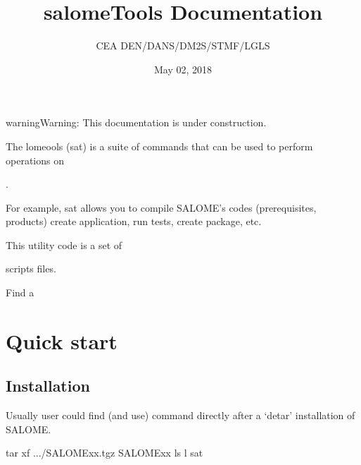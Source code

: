 \documentclass[a4paper,10pt,english]{sphinxmanual}
\title{salomeTools Documentation}
\date{May 02, 2018}
\author{CEA DEN/DANS/DM2S/STMF/LGLS}
\begin{document}
\maketitle
\sphinxtableofcontents
{}\label{\detokenize{index::doc}}
\clearpage




\begin{sphinxadmonition}{warning}{Warning:}
This documentation is under construction.
\end{sphinxadmonition}

The lomeools (sat) is a suite of commands
that can be used to perform operations on %
\begin{footnote}[1]\sphinxAtStartFootnote
{}
%
\end{footnote}.

For example, sat allows you to compile SALOME’s codes
(prerequisites, products)
create application, run tests, create package, etc.

This utility code is a set of %
\begin{footnote}[2]\sphinxAtStartFootnote
{}
%
\end{footnote} scripts files.

Find a 


\chapter{Quick start}
\label{\detokenize{index:quick-start}}\label{\detokenize{index:salome-tools}}

\section{Installation}
\label{\detokenize{installation_of_sat:installation}}\label{\detokenize{installation_of_sat::doc}}
Usually user could find (and use) command  directly after a ‘detar’ installation of SALOME.

%
\begin{sphinxVerbatim}[commandchars=\\\{\}]
tar \PYGZhy{}xf .../SALOME\PYGZus{}xx.tgz
 SALOME\PYGZus{}xx
ls \PYGZhy{}l sat      
\end{sphinxVerbatim}
\end{document}
